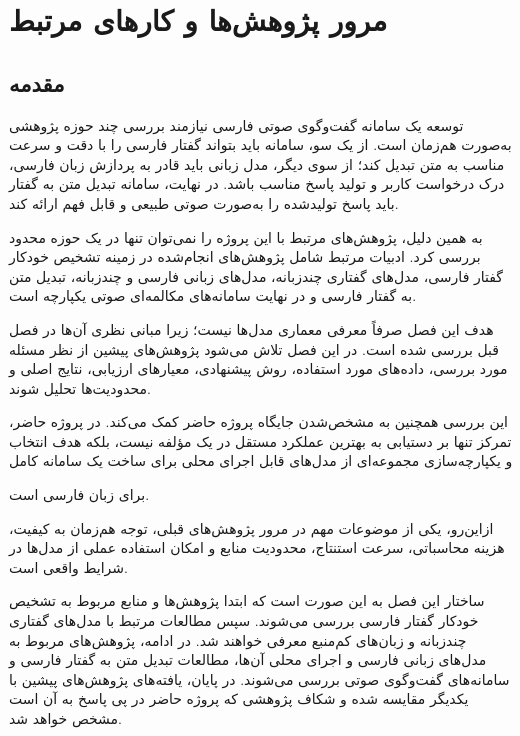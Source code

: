 
\chapter{مرور پژوهش‌ها و کارهای مرتبط}

\section{مقدمه}

توسعه یک سامانه گفت‌وگوی صوتی فارسی نیازمند بررسی چند حوزه
پژوهشی به‌صورت هم‌زمان است.
از یک سو، سامانه باید بتواند گفتار فارسی را با دقت و سرعت مناسب
به متن تبدیل کند؛ از سوی دیگر، مدل زبانی باید قادر به پردازش
زبان فارسی، درک درخواست کاربر و تولید پاسخ مناسب باشد.
در نهایت، سامانه تبدیل متن به گفتار باید پاسخ تولیدشده را
به‌صورت صوتی طبیعی و قابل فهم ارائه کند.

به همین دلیل، پژوهش‌های مرتبط با این پروژه را نمی‌توان تنها
در یک حوزه محدود بررسی کرد.
ادبیات مرتبط شامل پژوهش‌های انجام‌شده در زمینه تشخیص خودکار
گفتار فارسی، مدل‌های گفتاری چندزبانه، مدل‌های زبانی فارسی و
چندزبانه، تبدیل متن به گفتار فارسی و در نهایت سامانه‌های
مکالمه‌ای صوتی یکپارچه است.

هدف این فصل صرفاً معرفی معماری مدل‌ها نیست؛ زیرا مبانی نظری
آن‌ها در فصل قبل بررسی شده است.
در این فصل تلاش می‌شود پژوهش‌های پیشین از نظر مسئله مورد بررسی،
داده‌های مورد استفاده، روش پیشنهادی، معیارهای ارزیابی، نتایج
اصلی و محدودیت‌ها تحلیل شوند.

این بررسی همچنین به مشخص‌شدن جایگاه پروژه حاضر کمک می‌کند.
در پروژه حاضر، تمرکز تنها بر دستیابی به بهترین عملکرد مستقل
در یک مؤلفه نیست، بلکه هدف انتخاب و یکپارچه‌سازی مجموعه‌ای از
مدل‌های قابل اجرای محلی برای ساخت یک سامانه کامل

\begin{center}
\end{center}

برای زبان فارسی است.

ازاین‌رو، یکی از موضوعات مهم در مرور پژوهش‌های قبلی،
توجه هم‌زمان به کیفیت، هزینه محاسباتی، سرعت استنتاج،
محدودیت منابع و امکان استفاده عملی از مدل‌ها در شرایط واقعی
است.

ساختار این فصل به این صورت است که ابتدا پژوهش‌ها و منابع
مربوط به تشخیص خودکار گفتار فارسی بررسی می‌شوند.
سپس مطالعات مرتبط با مدل‌های گفتاری چندزبانه و زبان‌های
کم‌منبع معرفی خواهند شد.
در ادامه، پژوهش‌های مربوط به مدل‌های زبانی فارسی و اجرای
محلی آن‌ها، مطالعات تبدیل متن به گفتار فارسی و سامانه‌های
گفت‌وگوی صوتی بررسی می‌شوند.
در پایان، یافته‌های پژوهش‌های پیشین با یکدیگر مقایسه شده و
شکاف پژوهشی که پروژه حاضر در پی پاسخ به آن است مشخص خواهد شد.


